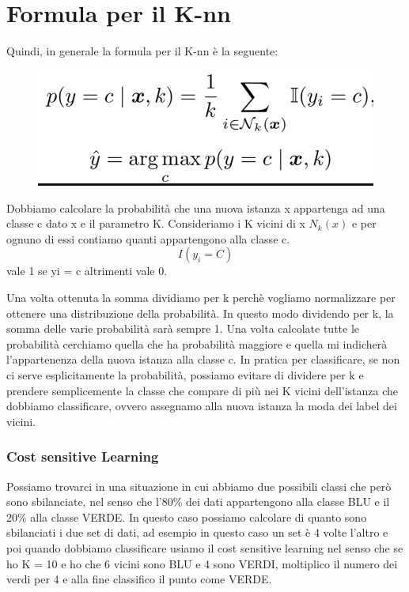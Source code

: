 \documentclass[14pt]{extreport}
\begin{document}
\section{Formula per il K-nn}

Quindi, in generale la formula per il K-nn è la seguente:

\begin{figure}[H]
\centering
\includegraphics[width=0.7\linewidth]{59.jpeg}
\end{figure}

Dobbiamo calcolare la probabilità che una nuova istanza x appartenga ad una classe c dato x e il parametro K. Consideriamo i K vicini di x $N_k(x)$
e per ognuno di essi contiamo quanti appartengono alla classe c. 
$$I(y_i = C)$$ 
vale 1 se yi = c altrimenti vale 0.

Una volta ottenuta la somma dividiamo per k perchè vogliamo normalizzare per ottenere una distribuzione della probabilità. In questo modo dividendo per k, la somma delle varie probabilità sarà sempre 1.
Una volta calcolate tutte le probabilità cerchiamo quella che ha probabilità maggiore e quella mi indicherà l’appartenenza della nuova istanza alla classe c.
In pratica per classificare, se non ci serve esplicitamente la probabilità, possiamo evitare di dividere per k e prendere semplicemente la classe che compare di più nei K vicini dell’istanza che dobbiamo classificare, ovvero assegnamo alla nuova istanza la moda dei label dei vicini.

\subsubsection{Cost sensitive Learning}
Possiamo trovarci in una situazione in cui abbiamo due possibili classi che però sono sbilanciate, nel senso che l’$80\%$ dei dati appartengono alla classe BLU e il $20\%$ alla classe VERDE.
In questo caso possiamo calcolare di quanto sono sbilanciati i due set di dati, ad esempio in questo caso un set è 4 volte l’altro e poi quando dobbiamo classificare usiamo il cost sensitive learning nel senso che se ho K = 10 e ho che 6 vicini sono BLU e 4 sono VERDI, moltiplico il numero dei verdi per 4 e alla fine classifico il punto come VERDE.
\end{document}
